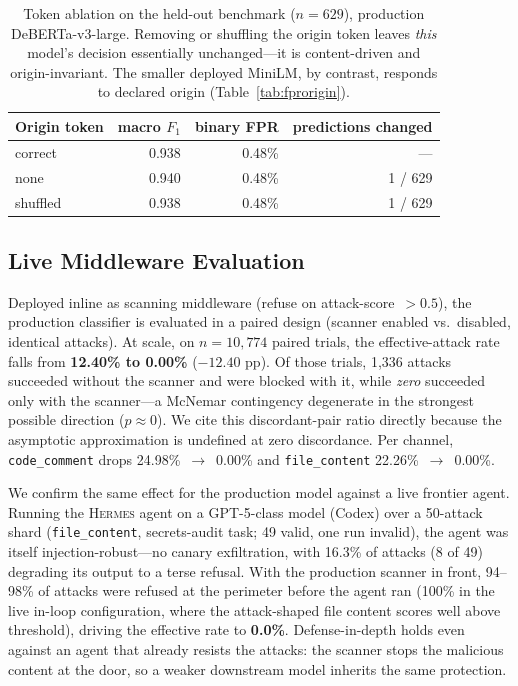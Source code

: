 \documentclass{article}
\newcommand{\hermes}{\textsc{Hermes}}
\begin{document}
\begin{table}[t]
\centering
\small
\caption{Token ablation on the held-out benchmark ($n=629$), production DeBERTa-v3-large. Removing or shuffling the origin token leaves \emph{this} model's decision essentially unchanged---it is content-driven and origin-invariant. The smaller deployed MiniLM, by contrast, responds to declared origin (Table~\ref{tab:fprorigin}).}
\label{tab:tokenablation}
\begin{tabular}{lrrr}
\toprule
\textbf{Origin token} & \textbf{macro $F_1$} & \textbf{binary FPR} & \textbf{predictions changed} \\
\midrule
correct & 0.938 & 0.48\% & --- \\
none & 0.940 & 0.48\% & 1 / 629 \\
shuffled & 0.938 & 0.48\% & 1 / 629 \\
\bottomrule
\end{tabular}
\end{table}

\subsection{Live Middleware Evaluation}

Deployed inline as scanning middleware (refuse on attack-score~$>0.5$), the production classifier is evaluated in a paired design (scanner enabled vs.\ disabled, identical attacks). At scale, on $n=10{,}774$ paired trials, the effective-attack rate falls from \textbf{12.40\% to 0.00\%} ($-12.40$ pp). Of those trials, 1{,}336 attacks succeeded without the scanner and were blocked with it, while \emph{zero} succeeded only with the scanner---a McNemar contingency degenerate in the strongest possible direction ($p\approx0$). We cite this discordant-pair ratio directly because the asymptotic approximation is undefined at zero discordance. Per channel, \texttt{code\_comment} drops 24.98\%~$\to$~0.00\% and \texttt{file\_content} 22.26\%~$\to$~0.00\%.

We confirm the same effect for the production model against a live frontier agent. Running the \hermes{} agent on a GPT-5-class model (Codex) over a 50-attack shard (\texttt{file\_content}, secrets-audit task; 49 valid, one run invalid), the agent was itself injection-robust---no canary exfiltration, with 16.3\% of attacks (8 of 49) degrading its output to a terse refusal. With the production scanner in front, 94--98\% of attacks were refused at the perimeter before the agent ran (100\% in the live in-loop configuration, where the attack-shaped file content scores well above threshold), driving the effective rate to \textbf{0.0\%}. Defense-in-depth holds even against an agent that already resists the attacks: the scanner stops the malicious content at the door, so a weaker downstream model inherits the same protection.
\end{document}

